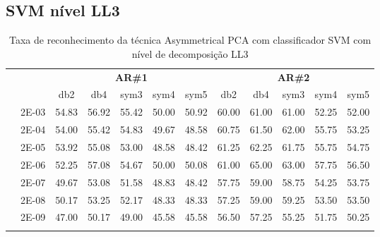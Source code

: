 \subsection{SVM nível LL3}

\begin{table}[H]
	\centering
    \normalsize
	\caption{Taxa de reconhecimento da técnica Asymmetrical PCA com classificador SVM com nível de decomposição LL3}
	\begin{tabular}{|c|c|c c c c c|c c c c c|}
\cline{3-12}
\multicolumn{2}{c|}{\multirow{2}{*}{}} & \multicolumn{5}{c|}{\textbf{AR\#1}}  & \multicolumn{5}{c|}{\textbf{AR\#2}} \\\cline{3-12}

\multicolumn{2}{c|}{}  & db2 & db4 & sym3 & sym4 & sym5 & db2 & db4& sym3 & sym4 & sym5 \\\hline
\multicolumn{1}{|c|}{ \multirow{6}{*}{\rotatebox[origin=c]{90}{\textbf{Gamma}}} }
&2E-03&	54.83&	56.92&	55.42&	50.00&	50.92&	60.00	&61.00&	61.00&	52.25&	52.00	\\\cline{2-12}
&2E-04&	54.00&	55.42&	54.83&	49.67&	48.58&	60.75	&61.50&	62.00&	55.75&	53.25	\\\cline{2-12}
&2E-05&	53.92&	55.08&	53.00&	48.58&	48.42&	61.25	&62.25&	61.75&	55.75&	54.75	\\\cline{2-12}
&2E-06&	52.25&	57.08&	54.67&	50.00&	50.08&	61.00	&65.00&	63.00&	57.75&	56.50	\\\cline{2-12}
&2E-07&	49.67&	53.08&	51.58&	48.83&	48.42&	57.75	&59.00&	58.75&	54.25&	53.75	\\\cline{2-12}
&2E-08&	50.17&	53.25&	52.17&	48.33&	48.33&	57.25	&59.00&	59.25&	53.50&	53.50	\\\cline{2-12}
&2E-09&	47.00&	50.17&	49.00&	45.58&	45.58&	56.50	&57.25&	55.25&	51.75&	50.25	

\\ \midrule
\multicolumn{12}{c}{}\\ 


\end{tabular}
\end{table}
